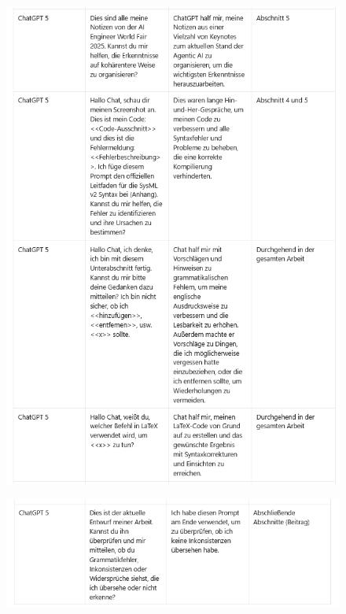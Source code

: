\begin{figure}[htbp]
  \centering
  \includegraphics[width=0.6\linewidth]{ressources/AI-usage/KI-NE3.png}
\end{figure}
\begin{figure}[htbp]
  \centering
  \includegraphics[width=0.6\linewidth]{ressources/AI-usage/KI-NE4.png}
\end{figure}